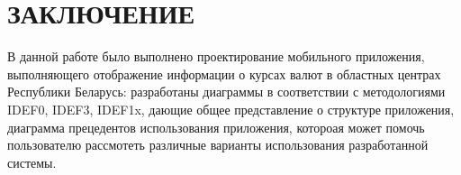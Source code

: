\section*{ЗАКЛЮЧЕНИЕ}

В данной работе было выполнено проектирование мобильного приложения,
выполняющего отображение информации о курсах валют
в областных центрах Республики Беларусь:
разработаны диаграммы в соответствии с методологиями
IDEF0, IDEF3, IDEF1x, дающие общее представление о структуре приложения,
диаграмма прецедентов использования приложения,
котороая может помочь пользователю рассмотеть различные
варианты использования разработанной системы.